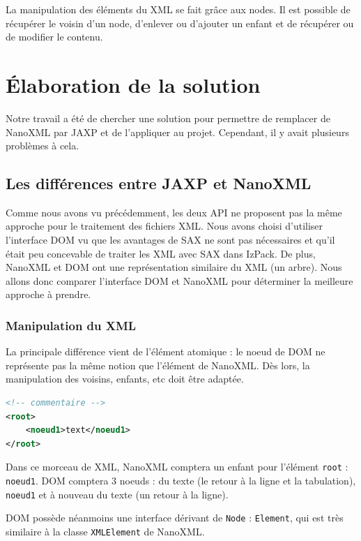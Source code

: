 La manipulation des éléments du XML se fait grâce aux nodes.
Il est possible de récupérer le voisin d'un node, d'enlever ou d'ajouter un enfant et de récupérer ou de modifier le contenu.
\section{Élaboration de la solution}
Notre travail a été de chercher une solution pour permettre de remplacer de NanoXML par JAXP et de l'appliquer au projet.
Cependant, il y avait plusieurs problèmes à cela.
\subsection{Les différences entre JAXP et NanoXML}
Comme nous avons vu précédemment, les deux API ne proposent pas la même approche pour le traitement des fichiers XML.
Nous avons choisi d'utiliser l'interface DOM vu que les avantages de SAX ne sont pas nécessaires et qu'il était peu concevable de traiter les XML avec SAX dans IzPack.
De plus, NanoXML et DOM ont une représentation similaire du XML (un arbre).
Nous allons donc comparer l'interface DOM et NanoXML pour déterminer la meilleure approche à prendre.
\subsubsection{Manipulation du XML}
La principale différence vient de l'élément atomique : le noeud de DOM ne représente pas la même notion que l'élément de NanoXML.
Dès lors, la manipulation des voisins, enfants, etc doit être adaptée.
\begin{lstlisting}[language=XML]
<!-- commentaire -->
<root>
	<noeud1>text</noeud1>
</root>
\end{lstlisting}
Dans ce morceau de XML, NanoXML comptera un enfant pour l'élément \verb|root| : \verb|noeud1|.
DOM comptera 3 noeuds : du texte (le retour à la ligne et la tabulation), \verb|noeud1| et à nouveau du texte (un retour à la ligne).

DOM possède néanmoins une interface dérivant de \verb|Node| : \verb|Element|, qui est très similaire à la classe \verb|XMLElement| de NanoXML.
